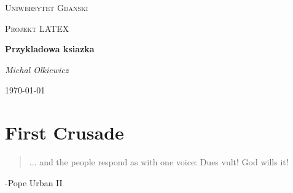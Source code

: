 \documentclass[11pt]{book}
\begin{document}

\begin{titlepage}
\centering
	{\scshape\LARGE Uniwersytet Gdanski\par}
	\vspace{1cm}
	{\scshape\Large Projekt LATEX\par}
	\vspace{1.5cm}
	{\huge\bfseries Przykladowa ksiazka\par}
	\vspace{2cm}
	{\Large\itshape Michal Olkiewicz\par}
	\vfill
	{\large \today\par}
\end{titlepage}
\chapter{First Crusade}
\begin{quote}
... and the people respond as with one voice:
\newline
Dues vult!
\newline
God wills it!
\end{quote}
-Pope Urban II
\newpage
\end{document}
